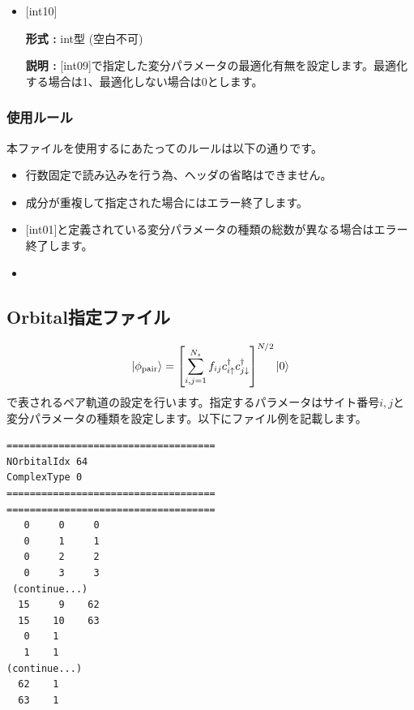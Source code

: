 \begin{itemize}
 \item  $[$int10$]$
   
   {\bf 形式 :} int型 (空白不可)

  {\bf 説明 :} [int09]で指定した変分パラメータの最適化有無を設定します。最適化する場合は1、最適化しない場合は0とします。
  
\end{itemize}

\subsubsection{使用ルール}
本ファイルを使用するにあたってのルールは以下の通りです。
\begin{itemize}
\item 行数固定で読み込みを行う為、ヘッダの省略はできません。
\item 成分が重複して指定された場合にはエラー終了します。
\item $[$int01$]$と定義されている変分パラメータの種類の総数が異なる場合はエラー終了します。
\item {}
\end{itemize}

\newpage
\subsection{Orbital指定ファイル}
\label{Subsec:Orbital}

\begin{equation}
|\phi_{\rm pair} \rangle = \left[\sum_{i, j=1}^{N_s} f_{ij}c_{i\uparrow}^{\dag}c_{j\downarrow}^{\dag} \right]^{N/2}|0 \rangle
\end{equation}
で表されるペア軌道の設定を行います。指定するパラメータはサイト番号$i, j$と変分パラメータの種類を設定します。以下にファイル例を記載します。

\begin{minipage}{12.5cm}
\begin{screen}
\begin{verbatim}
====================================
NOrbitalIdx 64   
ComplexType 0
====================================
====================================
   0     0     0 
   0     1     1 
   0     2     2 
   0     3     3 
 (continue...)
  15     9    62 
  15    10    63 
   0    1 
   1    1 
(continue...)
  62    1 
  63    1 
\end{verbatim}
\end{screen}
\end{minipage}


